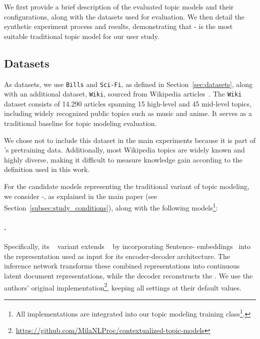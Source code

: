 %
We first provide a brief description of the evaluated topic models and their configurations, along with the datasets used for evaluation. We then detail the synthetic experiment process and results, demonstrating that \mallet{}-\lda{} is the most suitable traditional topic model for our user study.

\subsection{Datasets}
As datasets, we use \texttt{Bills} and \texttt{Sci-Fi}, as defined in Section~\ref{sec:datasets}, along with an additional dataset, \texttt{Wiki}, sourced from Wikipedia articles~\cite{Merity2017RegularizingAO}. The \texttt{Wiki} dataset consists of \num{14,290} articles spanning 15 high-level and 45 mid-level topics, including widely recognized public topics such as music and anime. It serves as a traditional baseline for topic modeling evaluation.
%

We chose not to include this dataset in the main experiments because it is part of \mm{}'s pretraining data. Additionally, most Wikipedia topics are widely known and highly diverse, making it difficult to measure knowledge gain according to the definition used in this work. 

For the candidate models representing the traditional variant of topic modeling, we consider \mallet{}-\lda{}, as explained in the main paper (see Section~\ref{subsec:study_conditions}), along with the following models\footnote{All implementations are integrated into our topic modeling training class\footnote{\url{https://github.com/zli12321/TopicModelLLM/blob/main/src/topic_modeling/topic_model.py}}.}:

\paragraph{\ctm{}.} Specifically, its ~\cite{kitty_CTM} variant extends ~\cite{prodLDA} by incorporating Sentence- embeddings~\cite[]{Reimers2019SentenceBERTSE} into the  representation used as input for its encoder-decoder architecture. The inference network transforms these combined representations into continuous latent document representations, while the decoder reconstructs the . We use the authors' original implementation\footnote{\url{https://github.com/MilaNLProc/contextualized-topic-models}}, keeping all settings at their default values.


